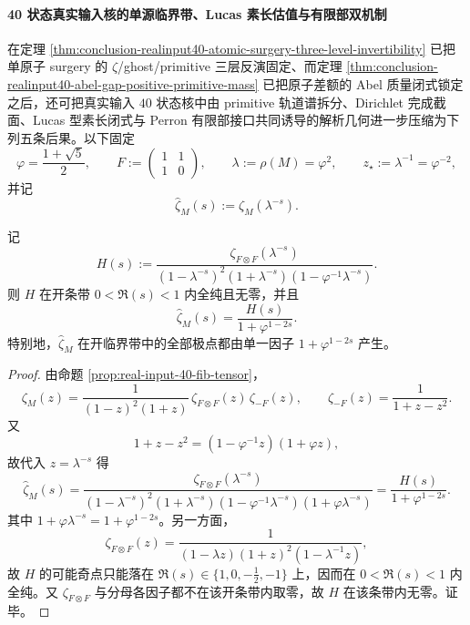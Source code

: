 \paragraph{40 状态真实输入核的单源临界带、Lucas 素长估值与有限部双机制}
在定理 \ref{thm:conclusion-realinput40-atomic-surgery-three-level-invertibility} 已把单原子 surgery 的 \(\zeta\)/ghost/primitive 三层反演固定、而定理 \ref{thm:conclusion-realinput40-abel-gap-positive-primitive-mass} 已把原子差额的 Abel 质量闭式锁定之后，还可把真实输入 \(40\) 状态核中由 primitive 轨道谱拆分、Dirichlet 完成截面、Lucas 型素长闭式与 Perron 有限部接口共同诱导的解析几何进一步压缩为下列五条后果。以下固定
\[
\varphi=\frac{1+\sqrt5}{2},
\qquad
F:=\begin{pmatrix}1&1\\[2pt]1&0\end{pmatrix},
\qquad
\lambda:=\rho(M)=\varphi^2,
\qquad
z_\star:=\lambda^{-1}=\varphi^{-2},
\]
并记
\[
\widehat{\zeta}_M(s):=\zeta_M(\lambda^{-s}).
\]

\begin{theorem}[开临界带的单源分解]\label{thm:conclusion-realinput40-open-strip-single-source}
记
\[
H(s):=
\frac{\zeta_{F\otimes F}(\lambda^{-s})}
{(1-\lambda^{-s})^2(1+\lambda^{-s})(1-\varphi^{-1}\lambda^{-s})}.
\]
则 \(H\) 在开条带 \(0<\Re(s)<1\) 内全纯且无零，并且
\[
\widehat{\zeta}_M(s)=\frac{H(s)}{1+\varphi^{1-2s}}.
\]
特别地，\(\widehat{\zeta}_M\) 在开临界带中的全部极点都由单一因子 \(1+\varphi^{1-2s}\) 产生。
\end{theorem}
\begin{proof}
由命题 \ref{prop:real-input-40-fib-tensor}，
\[
\zeta_M(z)=\frac{1}{(1-z)^2(1+z)}\,
\zeta_{F\otimes F}(z)\,\zeta_{-F}(z),
\qquad
\zeta_{-F}(z)=\frac{1}{1+z-z^2}.
\]
又
\[
1+z-z^2=(1-\varphi^{-1}z)(1+\varphi z),
\]
故代入 \(z=\lambda^{-s}\) 得
\[
\widehat{\zeta}_M(s)
=
\frac{\zeta_{F\otimes F}(\lambda^{-s})}
{(1-\lambda^{-s})^2(1+\lambda^{-s})(1-\varphi^{-1}\lambda^{-s})(1+\varphi\lambda^{-s})}
=
\frac{H(s)}{1+\varphi^{1-2s}}.
\]
其中 \(1+\varphi\lambda^{-s}=1+\varphi^{1-2s}\)。另一方面，
\[
\zeta_{F\otimes F}(z)=\frac{1}{(1-\lambda z)(1+z)^2(1-\lambda^{-1}z)},
\]
故 \(H\) 的可能奇点只能落在 \(\Re(s)\in\{1,0,-\tfrac12,-1\}\) 上，因而在 \(0<\Re(s)<1\) 内全纯。又 \(\zeta_{F\otimes F}\) 与分母各因子都不在该开条带内取零，故 \(H\) 在该条带内无零。证毕。
\end{proof}

